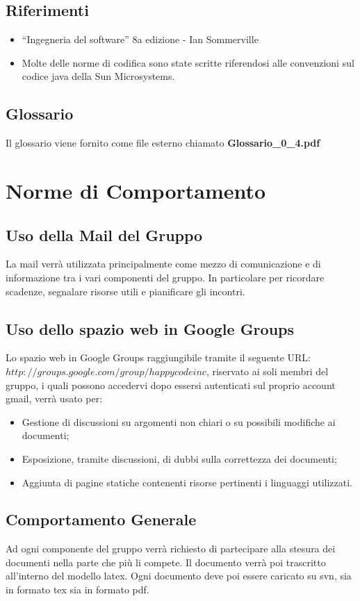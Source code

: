 \documentclass[11pt,titlepage,a4paper]{report}
\begin{document}
\section{Riferimenti}
\begin{itemize}
\item ``Ingegneria del software'' 8a edizione - Ian Sommerville 
\item Molte delle norme di codifica sono state scritte riferendosi alle convenzioni sul codice java della Sun Microsystems.
\end{itemize}
\section{Glossario}
Il glossario viene fornito come file esterno chiamato \textbf {Glossario\_0\_4.pdf} 



\chapter{Norme di Comportamento}
\section{Uso della Mail del Gruppo}
La mail verr\`a utilizzata principalmente come mezzo di comunicazione e di informazione tra i vari componenti del gruppo. In particolare per ricordare scadenze, segnalare risorse utili e pianificare gli incontri. 
\section{Uso dello spazio web in Google Groups}
Lo spazio web in Google Groups raggiungibile tramite il seguente URL: \({http://groups.google.com/group/happycodeinc}\), riservato ai soli membri del gruppo, i quali possono accedervi dopo essersi autenticati sul proprio account gmail, verr\`a usato per:
\begin{itemize}
\item Gestione di discussioni su argomenti non chiari o su possibili modifiche ai documenti;
\item Esposizione, tramite discussioni, di dubbi sulla correttezza dei documenti;
\item Aggiunta di pagine statiche contenenti risorse pertinenti i linguaggi utilizzati.
\end{itemize}
\section{Comportamento Generale}
Ad ogni componente del gruppo verr\`a richiesto di partecipare alla stesura dei documenti nella parte che pi\`u li compete. Il documento verr\`a poi trascritto all'interno del modello latex. Ogni documento deve poi essere caricato  su svn, sia in formato tex sia in formato pdf.
\end{document}
